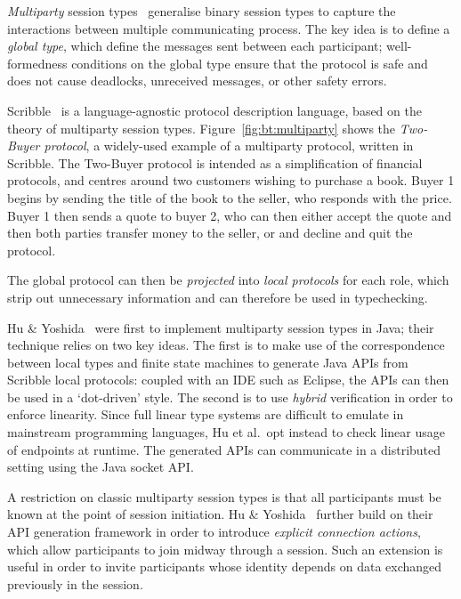 \documentclass[
graybox,
envcountchap
]{svmult}
\begin{document}
\begin{bibunit}
\emph{Multiparty} session types~\cite{HondaYC16:mpst} generalise binary session types to
capture the interactions between multiple communicating process. The key idea is
to define a \emph{global type}, which define the messages sent between each
participant; well-formedness conditions on the global type ensure that the
protocol is safe and does not cause deadlocks, unreceived messages, or other
safety errors.

Scribble~\cite{YoshidaHNN13:scribble} is a language-agnostic protocol description language, based
on the theory of multiparty session types. Figure~\ref{fig:bt:multiparty} shows
the \emph{Two-Buyer protocol}, a widely-used example of a multiparty protocol,
written in Scribble. The Two-Buyer protocol is intended as a simplification of
financial protocols, and centres around two customers wishing to purchase a
book. Buyer 1 begins by sending the title of the book to the seller, who
responds with the price. Buyer 1 then sends a quote to buyer 2, who can then
either accept the quote and then both parties transfer money to the seller, or
and decline and quit the protocol.

The global protocol can then be \emph{projected} into \emph{local protocols} for
each role, which strip out unnecessary information and can therefore be used in
typechecking.

  Hu \& Yoshida~\cite{HuY16:hybrid} were first to implement multiparty session
  types in Java; their technique relies on two key ideas. The first is to
  make use of the correspondence between local types and finite state machines
  to generate Java APIs from Scribble local protocols: coupled with an IDE such
  as Eclipse, the APIs can then be used in a `dot-driven' style. The second is
  to use \emph{hybrid} verification in order to enforce linearity. Since full
  linear type systems are difficult to emulate in mainstream programming
  languages, Hu et al.\ opt instead to check linear usage of endpoints at
  runtime. The generated APIs can communicate in a distributed setting using the
  Java socket API.

  A restriction on classic multiparty session types is that all participants
  must be known at the point of session initiation.  Hu \&
  Yoshida~\cite{HuY17:explicit} further build on their API generation framework
  in order to introduce \emph{explicit connection actions}, which allow
  participants to join midway through a session. Such an extension is useful in
  order to invite participants whose identity depends on data exchanged
  previously in the session.


\end{bibunit}
\end{document}
